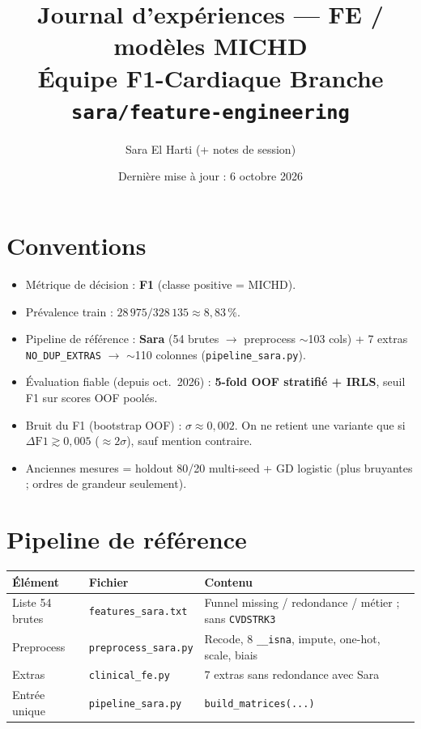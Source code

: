 \documentclass[11pt,a4paper]{article}
\title{Journal d'expériences --- FE / modèles MICHD\\
\large Équipe F1-Cardiaque \textperiodcentered{} Branche \texttt{sara/feature-engineering}}
\author{Sara El Harti (+ notes de session)}
\date{Dernière mise à jour : 6 octobre 2026}
\begin{document}
\maketitle

\section{Conventions}
\begin{itemize}
  \item Métrique de décision : \textbf{F1} (classe positive = MICHD).
  \item Prévalence train : $28\,975 / 328\,135 \approx 8{,}83\,\%$.
  \item Pipeline de référence : \textbf{Sara} (54 brutes $\to$ preprocess $\sim$103 cols)
        + 7 extras \texttt{NO\_DUP\_EXTRAS} $\to$ $\sim$110 colonnes
        (\texttt{pipeline\_sara.py}).
  \item Évaluation fiable (depuis oct.\ 2026) : \textbf{5-fold OOF stratifié + IRLS},
        seuil F1 sur scores OOF poolés.
  \item Bruit du F1 (bootstrap OOF) : $\sigma \approx 0{,}002$.
        On ne retient une variante que si $\Delta\mathrm{F1} \gtrsim 0{,}005$
        ($\approx 2\sigma$), sauf mention contraire.
  \item Anciennes mesures = holdout 80/20 multi-seed + GD logistic (plus bruyantes ;
        ordres de grandeur seulement).
\end{itemize}

\section{Pipeline de référence}
\begin{tabular}{@{}llp{7.2cm}@{}}
\toprule
Élément & Fichier & Contenu \\
\midrule
Liste 54 brutes & \texttt{features\_sara.txt} & Funnel missing / redondance / métier ; sans \texttt{CVDSTRK3} \\
Preprocess & \texttt{preprocess\_sara.py} & Recode, 8 \texttt{\_\_isna}, impute, one-hot, scale, biais \\
Extras & \texttt{clinical\_fe.py} & 7 extras sans redondance avec Sara \\
Entrée unique & \texttt{pipeline\_sara.py} & \texttt{build\_matrices(...)} \\
\bottomrule
\end{tabular}
\end{document}
